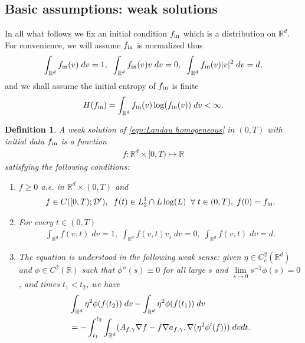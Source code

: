 \documentclass[12pt,american]{amsart}
\numberwithin{equation}{section}
\theoremstyle{plain}
\newtheorem{DEF}[thm]{Definition}
\theoremstyle{definition}                  %
\def\fin{f_{\textnormal{in}}}
\begin{document}
\subsection{Basic assumptions: weak solutions}
In all what follows we fix an initial condition $\fin$ which is a distribution on $\mathbb{R}^d$. For convenience, we will assume $\fin$ is normalized thus
\begin{align*}
  \int_{\mathbb{R}^d} \fin(v) \;dv = 1,\;\;\int_{\mathbb{R}^d} \fin(v) v\;dv =0,\;\;\int_{\mathbb{R}^d} \fin(v) |v|^2\;dv =d,	
\end{align*}	
and we shall assume the initial entropy of $\fin$ is finite
\begin{align*}
   H(\fin) =\int_{\mathbb{R}^d}\fin(v)\log(\fin(v))\;dv < \infty.
\end{align*}	
\begin{DEF} \label{def:solution} A weak solution of \eqref{eqn:Landau homogeneous} in $(0,T)$ with initial data $\fin$ is a function 
\begin{align*}
  f:\mathbb{R}^d\times [0,T)\mapsto \mathbb{R}
\end{align*}  
satisfying the following conditions:
  \begin{enumerate}  
  \item $f\geq 0$ a.e. in $\mathbb{R}^d\times (0,T)$ and	  
  \begin{align*}  
    f\in C([0,T);\mathcal{D}'),\;\; f(t) \in L^1_2\cap L\log(L)\;\;\forall\;t\in(0,T),\;f(0) = \fin.
  \end{align*}		
  \item For every $t\in (0,T)$
  \begin{align*}
     \int_{\mathbb{R}^d}f(v,t)\;dv = 1,\;\int_{\mathbb{R}^d}f(v,t)v_i\;dv = 0,\;\int_{\mathbb{R}^d}f(v,t)\;dv = d.  
  \end{align*}
  \item The equation is understood in the following weak sense: given $\eta \in C^2_c(\mathbb{R}^d)$ and $\phi\in C^2(\mathbb{R})$ such that $\phi''(s)\equiv 0$ for all large $s$ and $\lim\limits_{s\to 0}s^{-1}\phi(s) = 0$, and times $t_1<t_2$, we have
    \begin{align}
      & \int_{\mathbb{R}^d} \eta^2 \phi(f(t_2))\;dv-\int_{\mathbb{R}^d} \eta^2 \phi(f(t_1))\;dv \label{eqn:weak formulation}\\ 
      & = -\int_{t_1}^{t_2}\int_{\mathbb{R}^d} (A_{f,\gamma}\nabla f-f\nabla a_{f,\gamma}, \nabla (\eta^2 \phi'(f))) \;dvdt. \notag
    \end{align}


\end{enumerate}
\end{DEF}
\end{document}
